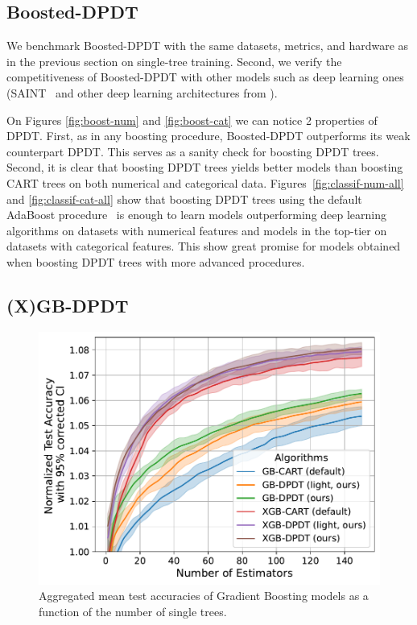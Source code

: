 \subsection{Boosted-DPDT}\label{sec:boosting}

We benchmark Boosted-DPDT with the same datasets, metrics, and hardware as in the previous section on single-tree training. Second, we verify the competitiveness of Boosted-DPDT with other models such as deep learning ones (SAINT~\cite{somepalli2021saintimprovedneuralnetworks} and other deep learning architectures from \cite{resnet}). 

On Figures \ref{fig:boost-num} and \ref{fig:boost-cat} we can notice 2 properties of DPDT. First, as in any boosting procedure, Boosted-DPDT outperforms its weak counterpart DPDT. This serves as a sanity check for boosting DPDT trees. Second, it is clear that boosting DPDT trees yields better models than boosting CART trees on both numerical and categorical data. Figures~\ref{fig:classif-num-all} and \ref{fig:classif-cat-all} show that boosting DPDT trees using the default AdaBoost procedure~\cite{FREUND1997119} is enough to learn models outperforming deep learning algorithms on datasets with numerical features and models in the top-tier on datasets with categorical features. This show great promise for models obtained when boosting DPDT trees with more advanced procedures.

\subsection{(X)GB-DPDT}
\begin{figure}
    \centering
    \includegraphics[trim={0 0 0 0},clip,width=0.6\linewidth]{images/figures/xgboosting_normalized_wo_opt.pdf}
    \caption{Aggregated mean test accuracies of Gradient Boosting models as a function of the number of single trees.}
    \label{fig:gb}
\end{figure}

